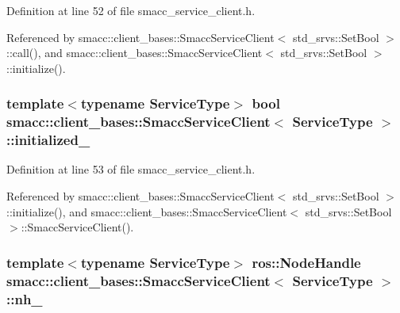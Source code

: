 Definition at line 52 of file smacc\+\_\+service\+\_\+client.\+h.



Referenced by smacc\+::client\+\_\+bases\+::\+Smacc\+Service\+Client$<$ std\+\_\+srvs\+::\+Set\+Bool $>$\+::call(), and smacc\+::client\+\_\+bases\+::\+Smacc\+Service\+Client$<$ std\+\_\+srvs\+::\+Set\+Bool $>$\+::initialize().

\subsubsection[{\texorpdfstring{initialized\+\_\+}{initialized_}}]{\setlength{\rightskip}{0pt plus 5cm}template$<$typename Service\+Type$>$ {\bf bool} {\bf smacc\+::client\+\_\+bases\+::\+Smacc\+Service\+Client}$<$ Service\+Type $>$\+::initialized\+\_\+\hspace{0.3cm}{\ttfamily [protected]}}\hypertarget{classsmacc_1_1client__bases_1_1SmaccServiceClient_ad36816c62fc14380a6d0782a2592a5b4}{}\label{classsmacc_1_1client__bases_1_1SmaccServiceClient_ad36816c62fc14380a6d0782a2592a5b4}


Definition at line 53 of file smacc\+\_\+service\+\_\+client.\+h.



Referenced by smacc\+::client\+\_\+bases\+::\+Smacc\+Service\+Client$<$ std\+\_\+srvs\+::\+Set\+Bool $>$\+::initialize(), and smacc\+::client\+\_\+bases\+::\+Smacc\+Service\+Client$<$ std\+\_\+srvs\+::\+Set\+Bool $>$\+::\+Smacc\+Service\+Client().

\subsubsection[{\texorpdfstring{nh\+\_\+}{nh_}}]{\setlength{\rightskip}{0pt plus 5cm}template$<$typename Service\+Type$>$ ros\+::\+Node\+Handle {\bf smacc\+::client\+\_\+bases\+::\+Smacc\+Service\+Client}$<$ Service\+Type $>$\+::nh\+\_\+\hspace{0.3cm}{\ttfamily [protected]}}\hypertarget{classsmacc_1_1client__bases_1_1SmaccServiceClient_afb62982383b8269c7962cd1588537489}{}\label{classsmacc_1_1client__bases_1_1SmaccServiceClient_afb62982383b8269c7962cd1588537489}


